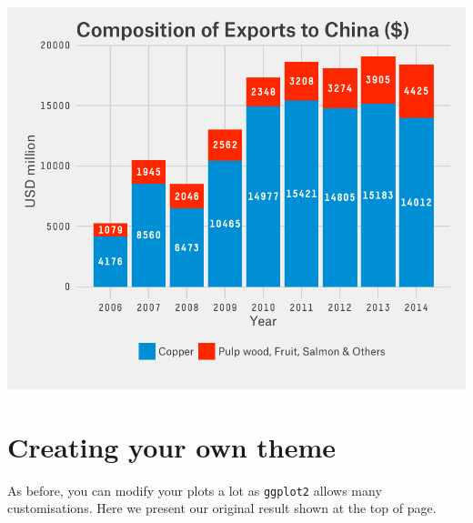 \begin{center}\includegraphics[width=0.6\linewidth]{3_Bar_Plots_pdf/bar_12-1} \end{center}

\section{Creating your own theme}\label{creating-your-own-theme}

As before, you can modify your plots a lot as \texttt{ggplot2} allows
many customisations. Here we present our original result shown at the
top of page.

